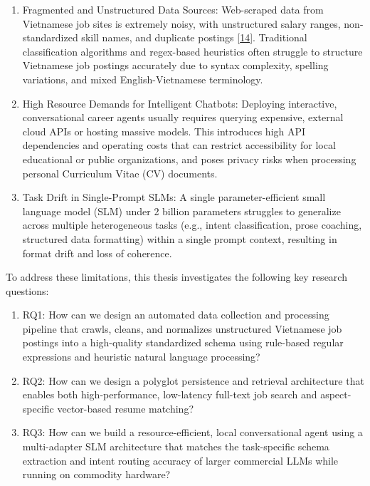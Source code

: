 \documentclass[12pt, a4paper]{report}
\begin{document}
\begin{enumerate}
    \item Fragmented and Unstructured Data Sources: Web-scraped data from Vietnamese job sites is extremely noisy, with unstructured salary ranges, non-standardized skill names, and duplicate postings [\hyperlink{cite14}{14}]. Traditional classification algorithms and regex-based heuristics often struggle to structure Vietnamese job postings accurately due to syntax complexity, spelling variations, and mixed English-Vietnamese terminology.
    \item High Resource Demands for Intelligent Chatbots: Deploying interactive, conversational career agents usually requires querying expensive, external cloud APIs or hosting massive models. This introduces high API dependencies and operating costs that can restrict accessibility for local educational or public organizations, and poses privacy risks when processing personal Curriculum Vitae (CV) documents.
    \item Task Drift in Single-Prompt SLMs: A single parameter-efficient small language model (SLM) under 2 billion parameters struggles to generalize across multiple heterogeneous tasks (e.g., intent classification, prose coaching, structured data formatting) within a single prompt context, resulting in format drift and loss of coherence.
\end{enumerate}

\vspace{0.8cm}
\vspace{0.4cm}

To address these limitations, this thesis investigates the following key research questions:

\begin{enumerate}
    \item RQ1: How can we design an automated data collection and processing pipeline that crawls, cleans, and normalizes unstructured Vietnamese job postings into a high-quality standardized schema using rule-based regular expressions and heuristic natural language processing?
    \item RQ2: How can we design a polyglot persistence and retrieval architecture that enables both high-performance, low-latency full-text job search and aspect-specific vector-based resume matching?
    \item RQ3: How can we build a resource-efficient, local conversational agent using a multi-adapter SLM architecture that matches the task-specific schema extraction and intent routing accuracy of larger commercial LLMs while running on commodity hardware?
\end{enumerate}
\end{document}
